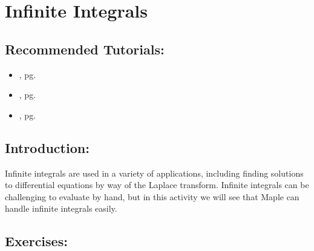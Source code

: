\section{Infinite Integrals}
\label{sec:infinite_integrals}

\subsection*{Recommended Tutorials:}
\begin{itemize}[noitemsep]
	\item {}, pg. \pageref{chp:plotting_functions}
	\item {}, pg. \pageref{chp:assignment_operator}
	\item {}, pg. \pageref{chp:definite_and_indefinite_Integrals}
\end{itemize}

\subsection*{Introduction:}

Infinite integrals are used in a variety of applications, including finding solutions to differential equations by way of the Laplace transform. Infinite integrals can be challenging to evaluate by hand, but in this activity we will see that Maple can handle infinite integrals easily.

\subsection*{Exercises:}

